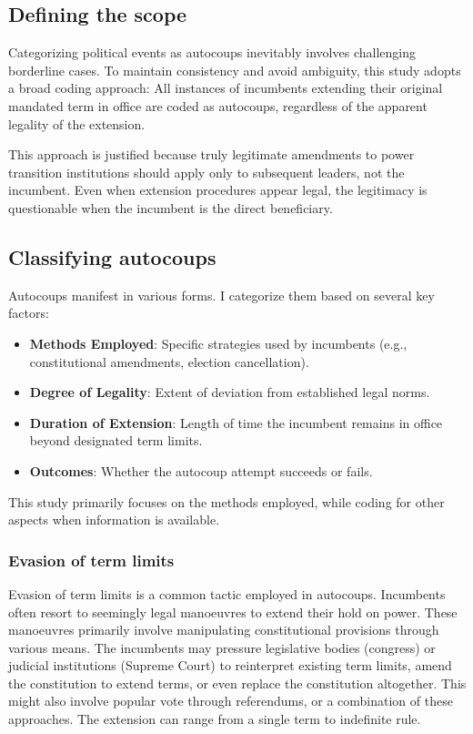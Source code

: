 \documentclass[
  12pt,
]{report}
\begin{document}
\subsection{Defining the scope}\label{defining-the-scope}

Categorizing political events as autocoups inevitably involves
challenging borderline cases. To maintain consistency and avoid
ambiguity, this study adopts a broad coding approach: All instances of
incumbents extending their original mandated term in office are coded as
autocoups, regardless of the apparent legality of the extension.

This approach is justified because truly legitimate amendments to power
transition institutions should apply only to subsequent leaders, not the
incumbent. Even when extension procedures appear legal, the legitimacy
is questionable when the incumbent is the direct beneficiary.

\subsection{Classifying autocoups}\label{sec-classify}

Autocoups manifest in various forms. I categorize them based on several
key factors:

\begin{itemize}
\item
  \textbf{Methods Employed}: Specific strategies used by incumbents
  (e.g., constitutional amendments, election cancellation).
\item
  \textbf{Degree of Legality}: Extent of deviation from established
  legal norms.
\item
  \textbf{Duration of Extension}: Length of time the incumbent remains
  in office beyond designated term limits.
\item
  \textbf{Outcomes}: Whether the autocoup attempt succeeds or fails.
\end{itemize}

This study primarily focuses on the methods employed, while coding for
other aspects when information is available.

\subsubsection*{Evasion of term limits}\label{evasion-of-term-limits}

Evasion of term limits is a common tactic employed in autocoups.
Incumbents often resort to seemingly legal manoeuvres to extend their
hold on power. These manoeuvres primarily involve manipulating
constitutional provisions through various means. The incumbents may
pressure legislative bodies (congress) or judicial institutions (Supreme
Court) to reinterpret existing term limits, amend the constitution to
extend terms, or even replace the constitution altogether. This might
also involve popular vote through referendums, or a combination of these
approaches. The extension can range from a single term to indefinite
rule.
\end{document}
